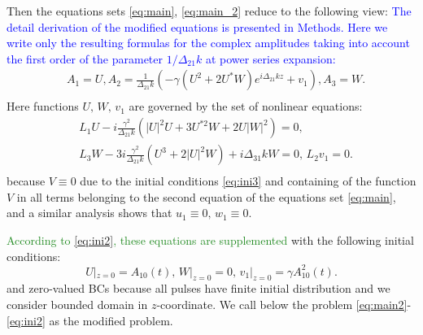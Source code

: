 \documentclass[a4paper, 12pt, onecolumn]{extarticle}
\begin{document}
Then the equations sets \eqref{eq:main}, \eqref{eq:main_2} reduce to the following view:
\textcolor{blue}{The detail derivation of the modified equations is presented in Methods. Here we write only the resulting formulas for the complex amplitudes taking into account the first order of the parameter \(1/\Delta_{21}k\) at power series expansion:} 
\begin{equation}
\label{eq:exp3}
\begin{aligned}
&A_1=U, A_2=\frac{1}{\Delta_{21}k}(-\gamma (U^2+2U^*W)e^{i\Delta_{21}kz}+v_1), A_3=W.\\
\end{aligned}
\end{equation}
Here functions \(U,\,W,\,v_1\) are governed by the set of nonlinear equations:
\begin{equation}
\label{eq:main2}
\begin{aligned}
&L_1U-i\frac{\gamma^2}{\Delta_{21} k}(|U|^2U+3U^{*2}W+2U|W|^2)=0,\\
&L_3W-3i\frac{\gamma^2}{\Delta_{21} k}(U^3+2|U|^2W)+i\Delta_{31}kW=0,\,L_2 v_1=0.\\
\end{aligned}
\end{equation}
because \(V\equiv0\) due to the initial conditions \eqref{eq:ini3} and containing of the function \(V\) in all terms belonging to the second equation of the equations set \eqref{eq:main}, and a similar analysis shows that \(u_1\equiv0,\,w_1\equiv0\).

\textcolor{ForestGreen}{According to \eqref{eq:ini2}, these equations are supplemented} with the following initial conditions:
\begin{equation}
\label{eq:ini2}
U|_{z=0}=A_{10}(t),\,W|_{z=0}=0,\,v_1|_{z=0}=\gamma A_{10}^2(t).
\end{equation}
and zero-valued BCs because all pulses have finite initial distribution and we consider bounded domain in \(z\)-coordinate. We call below the problem \eqref{eq:main2}-\eqref{eq:ini2} as the modified problem.
\end{document}
